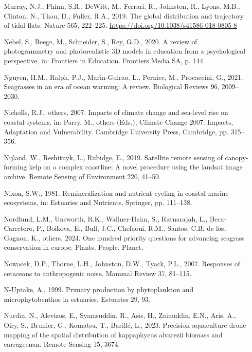 \documentclass[
  letterpaper,
  11pt,
  english,
  singlespacing,
  headsepline]{MastersDoctoralThesis}
\newlength{\cslhangindent}
\newenvironment{CSLReferences}[2] %
 {\begin{list}{}{%
  \setlength{\itemindent}{0pt}
  \setlength{\leftmargin}{0pt}
  \setlength{\parsep}{0pt}
  \ifodd #1
   \setlength{\leftmargin}{\cslhangindent}
   \setlength{\itemindent}{-1\cslhangindent}
  \fi
  \setlength{\itemsep}{#2\baselineskip}}}
 {\end{list}}
\begin{document}
\begin{CSLReferences}{1}{0}
Murray, N.J., Phinn, S.R., DeWitt, M., Ferrari, R., Johnston, R., Lyons,
M.B., Clinton, N., Thau, D., Fuller, R.A., 2019. {The global
distribution and trajectory of tidal flats}. Nature 565, 222--225.
\url{https://doi.org/10.1038/s41586-018-0805-8}

Nebel, S., Beege, M., Schneider, S., Rey, G.D., 2020. A review of
photogrammetry and photorealistic 3D models in education from a
psychological perspective, in: Frontiers in Education. Frontiers Media
SA, p. 144.

Nguyen, H.M., Ralph, P.J., Marı́n-Guirao, L., Pernice, M., Procaccini,
G., 2021. Seagrasses in an era of ocean warming: A review. Biological
Reviews 96, 2009--2030.

Nicholls, R.J., others, 2007. Impacts of climate change and sea-level
rise on coastal systems, in: Parry, M., others (Eds.), Climate Change
2007: Impacts, Adaptation and Vulnerability. Cambridge University Press,
Cambridge, pp. 315--356.

Nijland, W., Reshitnyk, L., Rubidge, E., 2019. Satellite remote sensing
of canopy-forming kelp on a complex coastline: A novel procedure using
the landsat image archive. Remote Sensing of Environment 220, 41--50.

Nixon, S.W., 1981. Remineralization and nutrient cycling in coastal
marine ecosystems, in: Estuaries and Nutrients. Springer, pp. 111--138.

Nordlund, L.M., Unsworth, R.K., Wallner-Hahn, S., Ratnarajah, L.,
Beca-Carretero, P., Boikova, E., Bull, J.C., Chefaoui, R.M., Santos,
C.B. de los, Gagnon, K., others, 2024. One hundred priority questions
for advancing seagrass conservation in europe. Plants, People, Planet.

Nowacek, D.P., Thorne, L.H., Johnston, D.W., Tyack, P.L., 2007.
Responses of cetaceans to anthropogenic noise. Mammal Review 37,
81--115.

N-Uptake, A., 1999. Primary production by phytoplankton and
microphytobenthos in estuaries. Estuaries 29, 93.

Nurdin, N., Alevizos, E., Syamsuddin, R., Asis, H., Zainuddin, E.N.,
Aris, A., Oiry, S., Brunier, G., Komatsu, T., Barillé, L., 2023.
Precision aquaculture drone mapping of the spatial distribution of
kappaphycus alvarezii biomass and carrageenan. Remote Sensing 15, 3674.


\end{CSLReferences}
\end{document}
